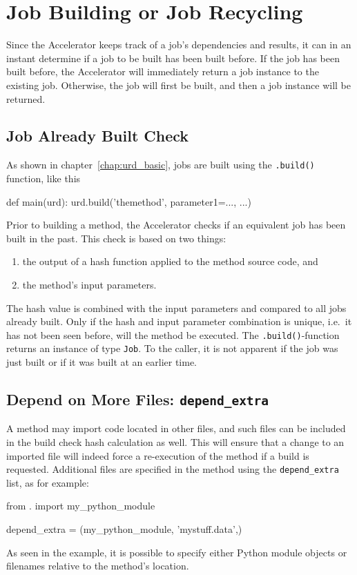 \section{Job Building or Job Recycling}
Since the Accelerator keeps track of a job's dependencies and results,
it can in an instant determine if a job to be built has been built
before.  If the job has been built before, the Accelerator will
immediately return a job instance to the existing job.  Otherwise, the
job will first be built, and then a job instance will be returned.


\subsection{Job Already Built Check}
As shown in chapter~\ref{chap:urd_basic}, jobs are built using
the \texttt{.build()} function, like this
\begin{python}
def main(urd):
    urd.build('themethod', parameter1=..., ...)
\end{python}

Prior to building a method, the Accelerator checks if an equivalent
job has been built in the past.  This check is based on two things:
\begin{enumerate}
\item  the output of a hash function applied to the method source code, and
\item  the method's input parameters.
\end{enumerate}
The hash value is combined with the input parameters and compared to
all jobs already built.  Only if the hash and input parameter
combination is unique, i.e.\ it has not been seen before, will the
method be executed.  The
\texttt{.build()}-function returns an instance of type \texttt{Job}.
To the caller, it is not apparent if the job was just built or if it
was built at an earlier time.


\subsection{Depend on More Files:  \texttt{depend\_extra}}
A method may import code located in other files, and such files can be
included in the build check hash calculation as well.  This will
ensure that a change to an imported file will indeed force a
re-execution of the method if a build is requested.  Additional files
are specified in the method using the \texttt{depend\_extra} list, as
for example:
\begin{python}
from . import my_python_module

depend_extra = (my_python_module, 'mystuff.data',)
\end{python}
As seen in the example, it is possible to specify either Python module
objects or filenames relative to the method's location.

